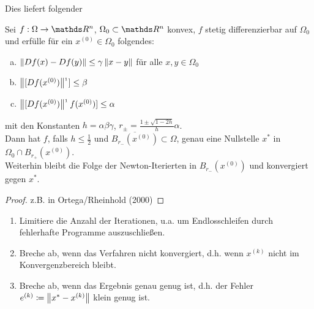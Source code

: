 Dies liefert folgender
\begin{satz}
  Sei $f:\Omega\rightarrow \Ren$, $\Omega_0 \subset \Ren$ konvex,
  $f$ stetig differenzierbar auf $\Omega_0$ und 
  erfülle für ein $x^{(0)}\in \Omega_0$ folgendes:
  \begin{enumerate}[a)]
  \item $\nn[Df(x) -Df(y)]\leq \gamma \nn[x-y]$ für alle $x,y\in \Omega_0$
  \item $\nn[[Df(x^{(0)})]^{_1}] \leq \beta$
  \item $\nn[[Df(x^{(0)})]^{_1}f(x^{(0)})] \leq \alpha$
  \end{enumerate}
  mit den Konstanten $h=\alpha\beta\gamma$, $r_\pm = \frac{1\pm \sqrt{1-2h}}{h}\alpha$.\\
  Dann hat $f$, falls $h\leq \frac{1}{2}$ und $\overline{B_{r_{-}}(x^{(0)})}\subset \Omega$,
  genau eine Nullstelle $x^{*}$ in $\Omega_0\cap B_{r_+}(x^{(0)})$.\\
  Weiterhin bleibt die Folge der Newton-Iterierten in $B_{r_{-}}(x^{(0)})$
  und konvergiert gegen $x^{*}$.
  \begin{proof}
    z.B. in Ortega/Rheinhold (2000)
  \end{proof}
\end{satz}


\begin{enumerate}[1)]
\item Limitiere die Anzahl der Iterationen, u.a. um 
  Endlosschleifen durch fehlerhafte Programme auszuschließen.
\item Breche ab, wenn das Verfahren nicht konvergiert, d.h.
  wenn $x^{(k)}$ nicht im Konvergenzbereich bleibt.
\item Breche ab, wenn das Ergebnis genau genug ist, d.h. der
  Fehler $e^{(k)}\coloneqq \nn[x^{*}-x^{(k)}]$ klein genug ist.
\end{enumerate}


